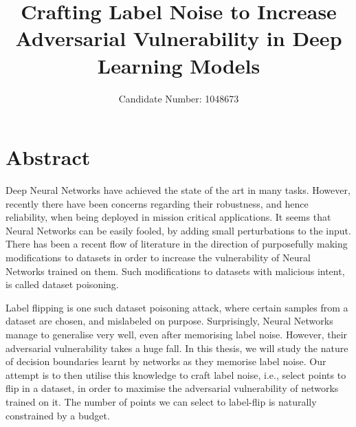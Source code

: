 \documentclass{ociamthesis}
\title{Crafting Label Noise to Increase Adversarial Vulnerability in Deep
Learning Models}
\author{Candidate Number: 1048673}
\date{}
\begin{document}
\maketitle


\chapter*{Abstract}
Deep Neural Networks have achieved the state of the art in many tasks. However,
recently there have been concerns regarding their robustness, and hence
reliability, when being deployed in mission critical applications. It seems that
Neural Networks can be easily fooled, by adding small perturbations to the
input. There has been a recent flow of literature in the direction of
purposefully making modifications to datasets in order to increase the
vulnerability of Neural Networks trained on them. Such modifications to datasets
with malicious intent, is called dataset poisoning.

Label flipping is one such dataset poisoning attack, where certain samples from
a dataset are chosen, and mislabeled on purpose. Surprisingly, Neural Networks
manage to generalise very well, even after memorising label noise. However,
their adversarial vulnerability takes a huge fall. In this thesis, we will study
the nature of decision boundaries learnt by networks as they memorise label
noise. Our attempt is to then utilise this knowledge to craft label noise, i.e.,
select points to flip in a dataset, in order to maximise the adversarial
vulnerability of networks trained on it. The number of points we can select to
label-flip is naturally constrained by a budget. 
\end{document}

